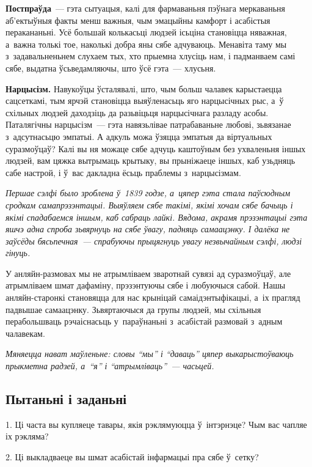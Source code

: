 \textbf{Постпраўда}~--- гэта сытуацыя, калі для фармаваньня пэўнага меркаваньня аб'ектыўныя факты менш важныя, чым эмацыйны камфорт і асабістыя перакананьні. Усё большай колькасьці людзей ісьціна становіцца няважная, а~важна толькі тое, наколькі добра яны сябе адчуваюць. Менавіта таму мы з~задавальненьнем слухаем тых, хто прыемна хлусіць нам, і падманваем самі сябе, выдатна ўсьведамляючы, што ўсё гэта~--- хлусьня.

\textbf{Нарцысізм.} Навукоўцы ўсталявалі, што, чым больш чалавек карыстаецца сацсеткамі, тым ярчэй становіцца выяўленасьць яго нарцысічных рыс, а~ў схільных людзей даходзіць да разьвіцьця нарцысічнага разладу асобы. Паталягічны нарцысізм~--- гэта навязьлівае патрабаваньне любові, зьвязанае з~адсутнасьцю эмпатыі. А адкуль можа ўзяцца эмпатыя да віртуальных суразмоўцаў? Калі вы ня можаце сябе адчуць каштоўным без ухваленьня іншых людзей, вам цяжка вытрымаць крытыку, вы прыніжаеце іншых, каб узьдняць сабе настрой, і ў~вас дакладна ёсьць праблемы з~нарцысізмам.

\emph{Першае сэлфі было зроблена ў~1839 годзе, а~цяпер гэта стала паўсюдным сродкам самапрэзэнтацыі. Выяўляем сябе такімі, якімі хочам сябе бачыць і якімі спадабаемся іншым, каб сабраць лайкі. Вядома, акрамя прэзэнтацыі гэта яшчэ адна спроба зьвярнуць на сябе ўвагу, падняць самаацэнку. І далёка не заўсёды бясьпечная~--- спрабуючы прыцягнуць увагу незвычайным сэлфі, людзі гінуць.} 


У анляйн-размовах мы не атрымліваем зваротнай сувязі ад суразмоўцаў, але атрымліваем шмат дафаміну, прэзэнтуючы сябе і любуючыся сабой. Нашы анляйн-старонкі становяцца для нас крыніцай самаідэнтыфікацыі, а~іх прагляд падвышае самаацэнку. Зьвяртаючыся да групы людзей, мы схільныя перабольшваць рэчаіснасьць у~параўнаньні з~асабістай размовай з~адным чалавекам.

\emph{Мяняецца нават маўленьне: словы ``мы'' і ``даваць'' цяпер выкарыстоўваюць прыкметна радзей, а~``я'' і ``атрымліваць''~--- часьцей.}

\subsection*{Пытаньні і заданьні}

1. Ці часта вы купляеце тавары, якія рэклямуюцца ў~інтэрнэце? Чым вас чапляе іх рэкляма?

2. Ці выкладваеце вы шмат асабістай інфармацыі пра сябе ў~сетку?


